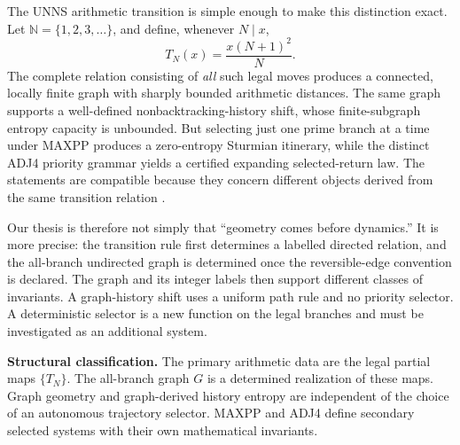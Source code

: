 \documentclass[11pt,a4paper]{article}
\theoremstyle{definition}\newtheorem{definition}[theorem]{Definition}
\newcommand{\N}{\mathbb N}
\begin{document}
The UNNS arithmetic transition is simple enough to make this distinction exact. Let $\N=\{1,2,3,\ldots\}$, and define, whenever $N\mid x$,
\begin{equation}\label{eq:T}
T_N(x)=\frac{x(N+1)^2}{N}.
\end{equation}
The complete relation consisting of \emph{all} such legal moves produces a connected, locally finite graph with sharply bounded arithmetic distances. The same graph supports a well-defined nonbacktracking-history shift, whose finite-subgraph entropy capacity is unbounded. But selecting just one prime branch at a time under MAXPP produces a zero-entropy Sturmian itinerary, while the distinct ADJ4 priority grammar yields a certified expanding selected-return law. The statements are compatible because they concern different objects derived from the same transition relation \cite{geometry,prime,adj,entropy}.

Our thesis is therefore not simply that ``geometry comes before dynamics.'' It is more precise: the transition rule first determines a labelled directed relation, and the all-branch undirected graph is determined once the reversible-edge convention is declared. The graph and its integer labels then support different classes of invariants. A graph-history shift uses a uniform path rule and no priority selector. A deterministic selector is a new function on the legal branches and must be investigated as an additional system.

\begin{takeaway}
\textbf{Structural classification.} The primary arithmetic data are the legal partial maps $\{T_N\}$. The all-branch graph $G$ is a determined realization of these maps. Graph geometry and graph-derived history entropy are independent of the choice of an autonomous trajectory selector. MAXPP and ADJ4 define secondary selected systems with their own mathematical invariants.
\end{takeaway}
\end{document}
